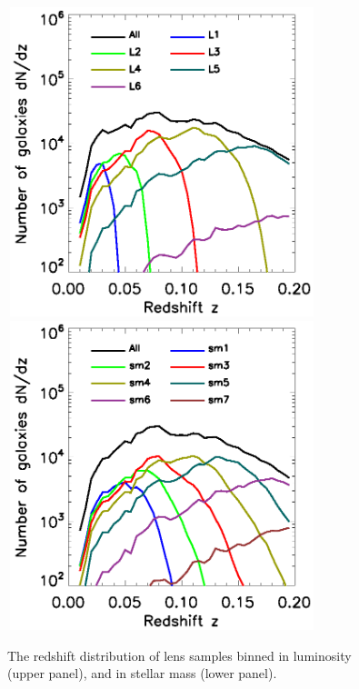 \documentclass[apj]{emulateapj}
\begin{document}
\begin{figure}
\centering
\includegraphics[width=9cm,height=9cm]{f3a.eps}
\includegraphics[width=9cm,height=9cm]{f3b.eps}
\caption{The redshift distribution of lens samples binned in
  luminosity (upper panel), and in stellar mass (lower panel).}
  \label{fig:zlens}
\end{figure}
\end{document}
